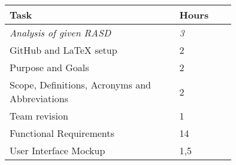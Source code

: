 \smallskip
\begin{center}
\begin{tabular}{ | p{0.75\linewidth} | l | }
  \hline
    \textbf{Task} & \textbf{Hours }\\ \hline
    \textit{Analysis of given RASD} & \textit{3} \\ \hline
    GitHub and LaTeX setup & 2 \\ \hline
    Purpose and Goals & 2 \\ \hline
    Scope, Definitions, Acronyms and Abbreviations & 2 \\ \hline
    Team revision & 1 \\ \hline
    Functional Requirements & 14 \\ \hline
    User Interface Mockup & 1,5 \\ \hline
\end{tabular}
\end{center}

\clearpage

